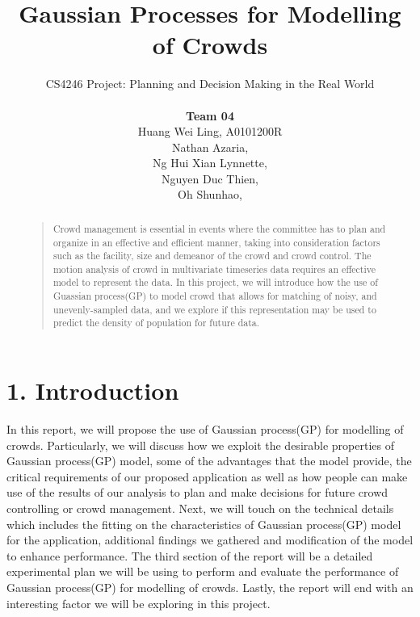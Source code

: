 \documentclass[letterpaper]{article}
\begin{document}
% 
\title{Gaussian Processes for Modelling of Crowds}
\author{CS4246 Project: Planning and Decision Making in the Real World  \\ \\
{\bf Team 04} \\ 
Huang Wei Ling, A0101200R\\
Nathan Azaria, \\
Ng Hui Xian Lynnette, \\
Nguyen Duc Thien, \\
Oh Shunhao, \\
}
\maketitle
\begin{abstract}
\begin{quote}
Crowd management is essential in events where the committee has to plan and organize in an effective and efficient manner, taking into consideration factors such as the facility, size and demeanor of the crowd and crowd control. The motion analysis of crowd in multivariate timeseries data requires an effective model to represent the data. In this project, we will introduce how the use of Guassian process(GP) to model crowd that allows for matching of noisy, and unevenly-sampled data, and we explore if this representation may be used to predict the density of population for future data. 
\end{quote}
\end{abstract}

\section{1.  Introduction}
In this report, we will propose the use of Gaussian process(GP) for modelling of crowds. Particularly, we will discuss how we exploit the desirable properties of Gaussian process(GP) model, some of the advantages that the model provide, the critical requirements of our proposed application as well as how people can make use of the results of our analysis to plan and make decisions for future crowd controlling or crowd management. Next, we will touch on the technical details which includes the fitting on the characteristics of Gaussian process(GP) model for the application, additional findings we gathered and modification of the model to enhance performance. The third section of the report will be a detailed experimental plan we will be using to perform and evaluate the performance of Gaussian process(GP) for modelling of crowds. Lastly, the report will end with an interesting factor we will be exploring in this project.
\end{document}
